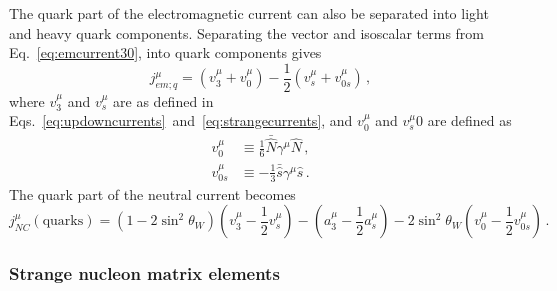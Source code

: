     The quark part of the electromagnetic current can also be separated into
    light and heavy quark components. Separating the vector and isoscalar terms
    from Eq.~\ref{eq:emcurrent30}, into quark components gives
    \begin{equation}
      j^{\mu}_{em;q} = (v^{\mu}_3 + v^{\mu}_0) - \frac{1}{2}(v^{\mu}_s + v^{\mu}_{0s}) \,,
    \end{equation}
    where $v^{\mu}_3$ and $v^{\mu}_s$ are as defined in
    Eqs.~\ref{eq:updowncurrents}~and~\ref{eq:strangecurrents}, and $v^{\mu}_0$
    and $v^{\mu}_s0$ are defined as
    \begin{equation}
      \begin{aligned}
        v^{\mu}_0 &\equiv \frac{1}{6}\bar{\hat{N}}\gamma^{\mu}\hat{N} \,, \\
        v^{\mu}_{0s} &\equiv -\frac{1}{3}\bar{\hat{s}}\gamma^{\mu}\hat{s} \,.
      \end{aligned}
    \end{equation}
    The quark part of the neutral current becomes
    \begin{equation}
      j^{\mu}_{NC}(\textrm{quarks}) = (1-2\sin^2\theta_W)(v^{\mu}_3 - \frac{1}{2}v^{\mu}_s)
                                    - (a^{\mu}_3 - \frac{1}{2}a^{\mu}_s)
                                    - 2\sin^2\theta_W(v^{\mu}_0 - \frac{1}{2}v^{\mu}_{0s}) \,.
    \end{equation}

  \subsubsection{Strange nucleon matrix elements}

